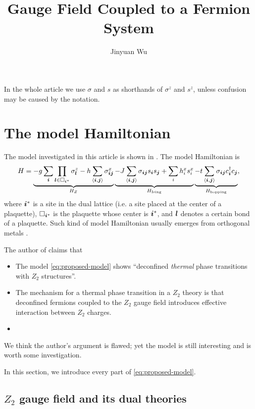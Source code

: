 \documentclass[hyperref, a4paper]{article}
\title{\Ztwo Gauge Field Coupled to a Fermion System}
\author{Jinyuan Wu}
\newcommand*{\pair}[1]{\langle #1 \rangle}
\newcommand*{\Ztwo}{\texorpdfstring{$\mathbb{Z}_2$ }{Z2 }}
\def\mathbb#1{#1}%
\begin{document}
\maketitle

In the whole article we use $\sigma$ and $s$ as shorthands of $\sigma^z$ and $s^z$, unless confusion may be caused by the notation.

\section{The model Hamiltonian}

The model investigated in this article is shown in \cite{moon2019deconfined}.
The model Hamiltonian is 
\begin{equation}
    H = \underbrace{- g \sum_{\vb*{i}} \prod_{\vb*{l} \in \Box_{\vb*{i}^*}} \sigma_{\vb*{l}}^z - h \sum_{\pair{\vb*{i}, \vb*{j}}} \sigma^x_{\vb*{i} \vb*{j}}}_{H_Z} \underbrace{- J \sum_{\pair{\vb*{i}, \vb*{j}}} \sigma_{\vb*{i} \vb*{j}} s_{\vb*{i}} s_{\vb*{j}} + \sum_i h^x_i s^x_i}_{H_\text{Ising}} \underbrace{- t \sum_{\pair{\vb*{i}, \vb*{j}}} \sigma_{\vb*{i} \vb*{j}} c^\dagger_{\vb*{i}} c_{\vb*{j}}}_{H_\text{hopping}},
    \label{eq:proposed-model}
\end{equation}
where $\vb*{i}^*$ is a site in the dual lattice (i.e. a site placed at the center of a plaquette), 
$\Box_{\vb*{i}^*}$ is the plaquette whose center is $\vb*{i}^*$, and $\vb*{l}$ denotes a certain bond of a plaquette.
Such kind of model Hamiltonian usually emerges from orthogonal metals \cite{moon2019deconfined, orthogonal_metal}.

The author of \cite{moon2019deconfined} claims that 
\begin{itemize}
    \item The model \eqref{eq:proposed-model} shows ``deconfined \emph{thermal} phase transitions with \Ztwo structures''. 
    \item The mechanism for a thermal phase transition in a \Ztwo theory is that deconfined fermions coupled to the \Ztwo gauge field introduces effective interaction between \Ztwo charges.
    \item %
\end{itemize}
We think the author's argument is flawed; yet the model is still interesting and is worth some investigation.

In this section, we introduce every part of \eqref{eq:proposed-model}.

\subsection{\Ztwo gauge field and its dual theories}
\end{document}
